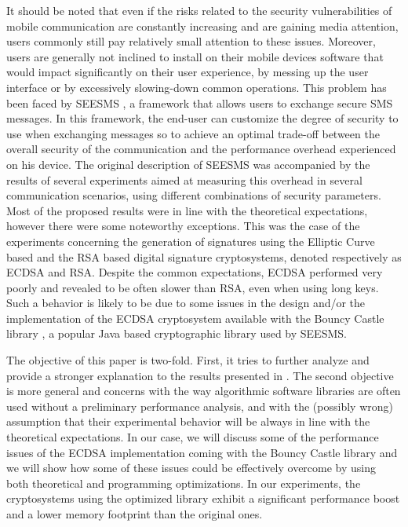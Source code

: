 \documentclass[authoryear]{elsarticle}
\begin{document}
It should be noted that even if the risks related to the security vulnerabilities of mobile communication are constantly increasing and are gaining media attention, users commonly still pay relatively small attention to these issues. Moreover, users are generally not inclined to install on their mobile devices software that would impact significantly on their user experience, by messing up the user interface or by excessively slowing-down common operations. 
This problem has been faced by SEESMS \citep{DeSantis2010}, a framework that allows users to exchange secure SMS messages. In this framework, the end-user can customize the degree of security to use when exchanging messages so to achieve an optimal trade-off between the overall security of the communication and the performance overhead experienced on his device.  The original description of SEESMS was accompanied by the results of several experiments aimed at measuring this overhead in several communication scenarios, using different combinations of security parameters. Most of the proposed results were in line with the theoretical expectations, however there were some noteworthy exceptions. This was the case of the experiments concerning the generation of signatures using the Elliptic Curve based  \citep{JohnsonMV01} and the RSA based \citep{Rivest78amethod} digital signature cryptosystems, denoted respectively as ECDSA and RSA. Despite the common expectations, ECDSA performed very poorly  and revealed to be often slower than RSA, even when using long keys. Such a behavior is likely to be due to some issues in the design and/or the implementation of the ECDSA cryptosystem available with the Bouncy Castle library  \citep{Bouncy}, a popular Java based cryptographic library used by SEESMS.

The objective of this paper is two-fold. First, it tries to further analyze and provide a stronger explanation to the results presented in  \citep{DeSantis2010}. The second objective is more general and concerns with the way algorithmic software libraries are often used without a preliminary performance analysis, and with the (possibly wrong) assumption that their experimental behavior will be always in line with the theoretical expectations. In our case, we will discuss some of the performance issues of the ECDSA implementation coming with the Bouncy Castle library and we will show how some of these issues could be effectively overcome by using both theoretical and programming optimizations. In our experiments, the cryptosystems using the optimized library exhibit a significant performance boost and a lower memory footprint than the original ones.
\end{document}
